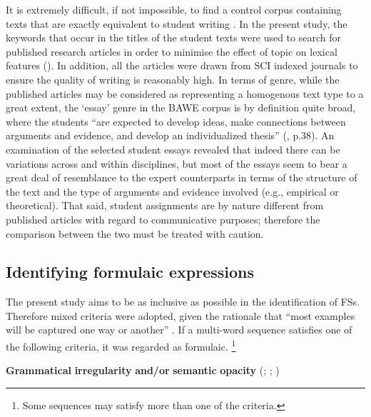 \documentclass[output=paper]{langsci/langscibook}
\begin{document}
It is extremely difficult, if not impossible, to find a control corpus containing texts that are exactly equivalent to student writing \citep{Callies2015}. In the present study, the keywords that occur in the titles of the student texts were used to search for published research articles in order to minimise the effect of topic on lexical features (\citealt{CainesButtery2017}). In addition, all the articles were drawn from SCI indexed journals to ensure the quality of writing is reasonably high. In terms of genre, while the published articles may be considered as representing a homogenous text type to a great extent, the ‘essay’ genre in the BAWE corpus is by definition quite broad, where the students “are expected to develop ideas, make connections between arguments and evidence, and develop an individualized thesis” (\citealt{NesiGardner2012}, p.38). An examination of the selected student essays revealed that indeed there can be variations across and within disciplines, but most of the essays seem to bear a great deal of resemblance to the expert counterparts in terms of the structure of the text and the type of arguments and evidence involved (e.g., empirical or theoretical). That said, student assignments are by nature different from published articles with regard to communicative purposes; therefore the comparison between the two must be treated with caution. 

\subsection{Identifying formulaic expressions}

The present study aims to be as inclusive as possible in the identification of FSs. Therefore mixed criteria were adopted, given the rationale that “most examples will be captured one way or another” \citep[110]{Wray2008}. If a multi-word sequence satisfies one of the following criteria, it was regarded as formulaic. \footnote{ \textrm{Some sequences may satisfy more than one of the criteria.}}

\textbf{Grammatical} \textbf{irregularity} \textbf{and/or} \textbf{semantic} \textbf{opacity} (\citealt{Wray2008}; \citealt{SchneiderEtAl2014}; \citealt{Herbst2015})
\end{document}

